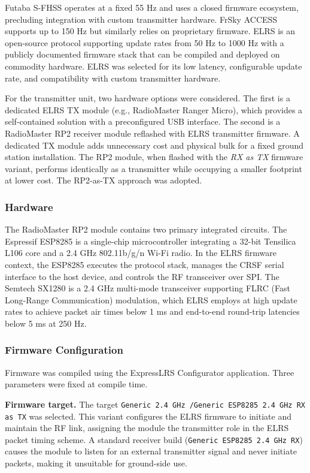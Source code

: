 Futaba S-FHSS operates at a fixed 55 Hz and uses a closed firmware ecosystem, precluding
integration with custom transmitter hardware.
FrSky ACCESS supports up to 150 Hz but similarly relies on proprietary firmware.
ELRS is an open-source protocol supporting update rates from 50 Hz to 1000 Hz with a publicly
documented firmware stack that can be compiled and deployed on commodity hardware.
ELRS was selected for its low latency, configurable update rate, and compatibility with custom
transmitter hardware.

For the transmitter unit, two hardware options were considered.
The first is a dedicated ELRS TX module (e.g., RadioMaster Ranger Micro), which provides a
self-contained solution with a preconfigured USB interface.
The second is a RadioMaster RP2 receiver module reflashed with ELRS transmitter firmware.
A dedicated TX module adds unnecessary cost and physical bulk for a fixed ground station
installation.
The RP2 module, when flashed with the \emph{RX as TX} firmware variant, performs identically as a
transmitter while occupying a smaller footprint at lower cost.
The RP2-as-TX approach was adopted.

\subsubsection{Hardware}

The RadioMaster RP2 module contains two primary integrated circuits.
The Espressif ESP8285 is a single-chip microcontroller integrating a 32-bit Tensilica L106 core
and a 2.4 GHz 802.11b/g/n Wi-Fi radio.
In the ELRS firmware context, the ESP8285 executes the protocol stack, manages the CRSF
serial interface to the host device, and controls the RF transceiver over SPI.
The Semtech SX1280 is a 2.4 GHz multi-mode transceiver supporting FLRC (Fast Long-Range
Communication) modulation, which ELRS employs at high update rates to achieve packet air times
below 1 ms and end-to-end round-trip latencies below 5 ms at 250 Hz.

\subsubsection{Firmware Configuration}
\label{subsubsec:fw-config}

Firmware was compiled using the ExpressLRS Configurator application.
Three parameters were fixed at compile time.

\textbf{Firmware target.}
The target
\texttt{Generic 2.4\,GHz /\allowbreak Generic ESP8285 2.4\,GHz RX as TX} was selected.
This variant configures the ELRS firmware to initiate and maintain the RF link, assigning the
module the transmitter role in the ELRS packet timing scheme.
A standard receiver build (\texttt{Generic ESP8285 2.4\,GHz RX}) causes the module to listen
for an external transmitter signal and never initiate packets, making it unsuitable for ground-side
use.


